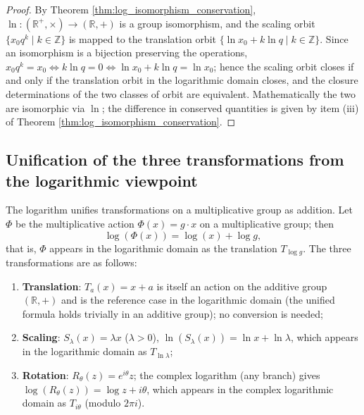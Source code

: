 \begin{proof}
By Theorem \ref{thm:log_isomorphism_conservation}, $\ln: (\mathbb{R}^+, \times) \to (\mathbb{R}, +)$ is a group isomorphism, and the scaling orbit $\{x_0 q^k \mid k\in\mathbb{Z}\}$ is mapped to the translation orbit $\{\ln x_0 + k\ln q \mid k\in\mathbb{Z}\}$. Since an isomorphism is a bijection preserving the operations, $x_0 q^k = x_0 \iff k\ln q = 0 \iff \ln x_0 + k\ln q = \ln x_0$; hence the scaling orbit closes if and only if the translation orbit in the logarithmic domain closes, and the closure determinations of the two classes of orbit are equivalent. Mathematically the two are isomorphic via $\ln$; the difference in conserved quantities is given by item (iii) of Theorem \ref{thm:log_isomorphism_conservation}.
\end{proof}

\subsection{\texorpdfstring{Unification of the three transformations from the logarithmic viewpoint}{Unification of the three transformations from the logarithmic viewpoint}}

\begin{theorem}\label{thm:log_unification}
The logarithm unifies transformations on a multiplicative group as addition. Let $\Phi$ be the multiplicative action $\Phi(x) = g \cdot x$ on a multiplicative group; then
\[
\log(\Phi(x)) = \log(x) + \log g,
\]
that is, $\Phi$ appears in the logarithmic domain as the translation $T_{\log g}$. The three transformations are as follows:
\begin{enumerate}[label=(\roman*)]
    \item \textbf{Translation}: $T_a(x) = x + a$ is itself an action on the additive group $(\mathbb{R},+)$ and is the reference case in the logarithmic domain (the unified formula holds trivially in an additive group); no conversion is needed;
    \item \textbf{Scaling}: $S_\lambda(x) = \lambda x$ ($\lambda > 0$), $\ln(S_\lambda(x)) = \ln x + \ln \lambda$, which appears in the logarithmic domain as $T_{\ln\lambda}$;
    \item \textbf{Rotation}: $R_\theta(z) = e^{i\theta}z$; the complex logarithm (any branch) gives $\log(R_\theta(z)) = \log z + i\theta$, which appears in the complex logarithmic domain as $T_{i\theta}$ (modulo $2\pi i$).
\end{enumerate}
\end{theorem}

